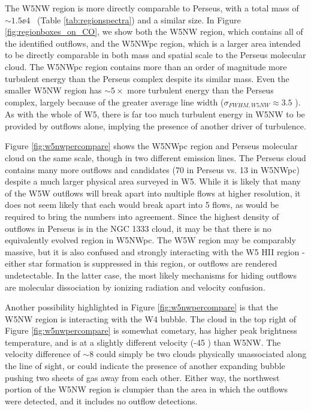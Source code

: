 The W5NW region is more directly comparable to Perseus, with a total mass of
$\sim1.5\ee{4}$ \msun\ (Table \ref{tab:regionspectra}) and a similar size.  In
Figure \ref{fig:regionboxes_on_CO}, we show both the W5NW region, which
contains all of the identified outflows, and the W5NWpc region, which is a
larger area intended to be directly comparable in both mass and spatial scale
to the Perseus molecular cloud.  The W5NWpc region contains more than an order of
magnitude more turbulent energy than the Perseus complex \citep[$E_{turb,Per} =
1.6\ee{46}$ ergs,][]{arce2010} despite its similar mass.  Even the smaller W5NW
region has $\sim5\times$ more turbulent energy than the Perseus complex,
largely because of the greater average line width ($\sigma_{FWHM,W5NW}\approx
3.5$ \kms).  As with the whole of W5, there is far too much turbulent energy in
W5NW to be provided by outflows alone, implying the presence of another driver
of turbulence.

Figure \ref{fig:w5nwpercompare} shows the W5NWpc region and Perseus molecular cloud
on the same scale, though in two different emission lines.  The Perseus cloud
contains many more outflows and candidates (70 in Perseus vs. 13 in W5NWpc)
despite a much larger physical area surveyed in W5.  While it is likely that
many of the W5W outflows will break apart into multiple flows at higher
resolution, it does not seem likely that each would break apart into 5 flows,
as would be required to bring the numbers into agreement.  Since the highest
density of outflows in Perseus is in the NGC 1333 cloud, it may be that there
is no equivalently evolved region in W5NWpc.  The W5W region may be comparably
massive, but it is also confused and strongly interacting with the W5 HII
region - either star formation is suppressed in this region, or outflows are
rendered undetectable.  In the latter case, the most likely mechanisms for
hiding outflows are molecular dissociation by ionizing radiation and velocity
confusion.

Another possibility highlighted in Figure \ref{fig:w5nwpercompare} is that the
W5NW region is interacting with the W4 bubble.  The cloud in the top right of
Figure \ref{fig:w5nwpercompare} is somewhat cometary, has higher peak
brightness temperature, and is at a slightly different velocity (-45 \kms) than
W5NW.  The velocity difference of $\sim8$ \kms could simply be two clouds
physically unassociated along the line of sight, or could indicate the presence
of another expanding bubble pushing two sheets of gas away from each other.
Either way, the northwest portion of the W5NW region is clumpier than the
area in which the outflows were detected, and it includes no outflow detections.

